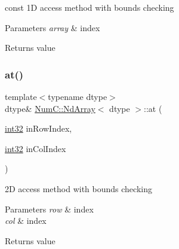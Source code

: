 const 1D access method with bounds checking


\begin{DoxyParams}{Parameters}
{\em array} & index \\
\hline
\end{DoxyParams}
\begin{DoxyReturn}{Returns}
value 
\end{DoxyReturn}
\mbox{\label{class_num_c_1_1_nd_array_a1b7551b29fd04ad88102ae279357057a}} 
\subsubsection{\texorpdfstring{at()}{at()}\hspace{0.1cm}{\footnotesize\ttfamily [3/8]}}
{\footnotesize\ttfamily template$<$typename dtype$>$ \\
dtype\& \mbox{\hyperlink{class_num_c_1_1_nd_array}{Num\+C\+::\+Nd\+Array}}$<$ dtype $>$\+::at (\begin{DoxyParamCaption}\item[{\mbox{\hyperlink{namespace_num_c_aa5a7e69266097d55816d4cdb19542b53}{int32}}}]{in\+Row\+Index,  }\item[{\mbox{\hyperlink{namespace_num_c_aa5a7e69266097d55816d4cdb19542b53}{int32}}}]{in\+Col\+Index }\end{DoxyParamCaption})\hspace{0.3cm}{\ttfamily [inline]}}

2D access method with bounds checking


\begin{DoxyParams}{Parameters}
{\em row} & index \\
\hline
{\em col} & index \\
\hline
\end{DoxyParams}
\begin{DoxyReturn}{Returns}
value 
\end{DoxyReturn}
\mbox{\label{class_num_c_1_1_nd_array_a2a0ece5152ba2a14d4e9ae0566499052}} 

